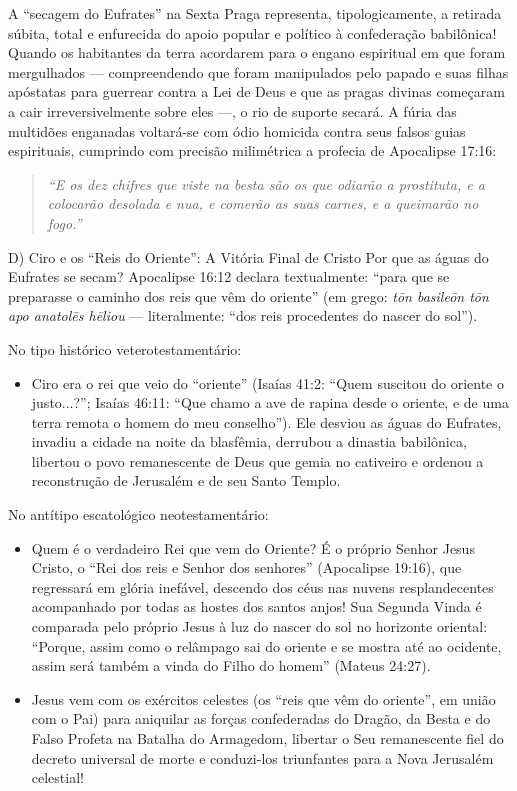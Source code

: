 \documentclass[11pt,a4paper,openany]{book}
\begin{document}
A ``secagem do Eufrates'' na Sexta Praga representa, tipologicamente, a retirada súbita, total e enfurecida do apoio popular e político à confederação babilônica! Quando os habitantes da terra acordarem para o engano espiritual em que foram mergulhados — compreendendo que foram manipulados pelo papado e suas filhas apóstatas para guerrear contra a Lei de Deus e que as pragas divinas começaram a cair irreversivelmente sobre eles —, o rio de suporte secará. A fúria das multidões enganadas voltará-se com ódio homicida contra seus falsos guias espirituais, cumprindo com precisão milimétrica a profecia de Apocalipse 17:16:

\begin{quote}
\itshape ``E os dez chifres que viste na besta são os que odiarão a prostituta, e a colocarão desolada e nua, e comerão as suas carnes, e a queimarão no fogo.''
\end{quote}


D) Ciro e os ``Reis do Oriente'': A Vitória Final de Cristo
Por que as águas do Eufrates se secam? Apocalipse 16:12 declara textualmente: ``para que se preparasse o caminho dos reis que vêm do oriente'' (em grego: \textit{tōn basileōn tōn apo anatolēs hēliou} — literalmente: ``dos reis procedentes do nascer do sol'').

No tipo histórico veterotestamentário:
\begin{itemize}
  \item Ciro era o rei que veio do ``oriente'' (Isaías 41:2: ``Quem suscitou do oriente o justo...?''; Isaías 46:11: ``Que chamo a ave de rapina desde o oriente, e de uma terra remota o homem do meu conselho''). Ele desviou as águas do Eufrates, invadiu a cidade na noite da blasfêmia, derrubou a dinastia babilônica, libertou o povo remanescente de Deus que gemia no cativeiro e ordenou a reconstrução de Jerusalém e de seu Santo Templo.
\end{itemize}


No antítipo escatológico neotestamentário:
\begin{itemize}
  \item Quem é o verdadeiro Rei que vem do Oriente? É o próprio Senhor Jesus Cristo, o ``Rei dos reis e Senhor dos senhores'' (Apocalipse 19:16), que regressará em glória inefável, descendo dos céus nas nuvens resplandecentes acompanhado por todas as hostes dos santos anjos! Sua Segunda Vinda é comparada pelo próprio Jesus à luz do nascer do sol no horizonte oriental: ``Porque, assim como o relâmpago sai do oriente e se mostra até ao ocidente, assim será também a vinda do Filho do homem'' (Mateus 24:27).
  \item Jesus vem com os exércitos celestes (os ``reis que vêm do oriente'', em união com o Pai) para aniquilar as forças confederadas do Dragão, da Besta e do Falso Profeta na Batalha do Armagedom, libertar o Seu remanescente fiel do decreto universal de morte e conduzi-los triunfantes para a Nova Jerusalém celestial!
\end{itemize}
\end{document}
